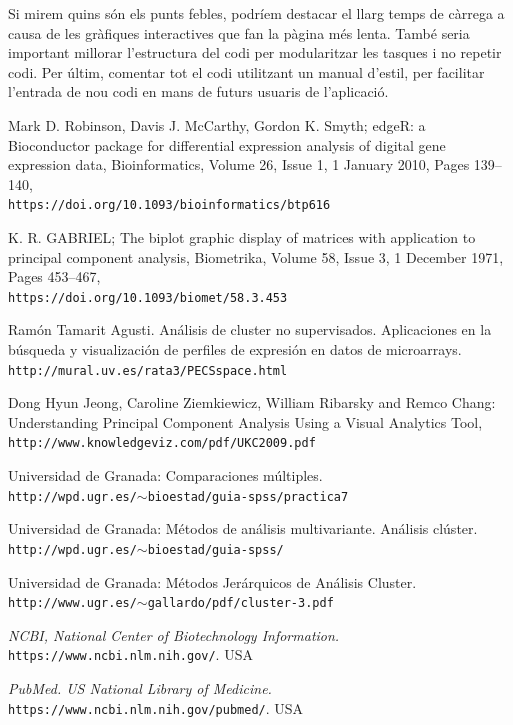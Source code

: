 \documentclass[english]{article}
\begin{document}
Si mirem quins són els punts febles, podríem destacar el llarg temps de càrrega a causa de les gràfiques interactives que fan la pàgina més lenta. També seria important millorar l'estructura del codi per modularitzar les tasques i no repetir codi. Per últim, comentar tot el codi utilitzant un manual d'estil, per facilitar l'entrada de nou codi en mans de futurs usuaris de l'aplicació.
\clearpage
\begin{thebibliography}{9}
Mark D. Robinson, Davis J. McCarthy, Gordon K. Smyth; edgeR: a Bioconductor package for differential expression analysis of digital gene expression data, Bioinformatics, Volume 26, Issue 1, 1 January 2010, Pages 139–140,
\\\texttt{https://doi.org/10.1093/bioinformatics/btp616}

K. R. GABRIEL; The biplot graphic display of matrices with application to principal component analysis, Biometrika, Volume 58, Issue 3, 1 December 1971, Pages 453–467, \\\texttt{https://doi.org/10.1093/biomet/58.3.453}

Ramón Tamarit Agusti. Análisis de cluster no supervisados. Aplicaciones en
la búsqueda y visualización de perfiles de expresión
en datos de microarrays.
\\\texttt{http://mural.uv.es/rata3/PECSspace.html}

Dong Hyun Jeong, Caroline Ziemkiewicz, William Ribarsky and Remco Chang: Understanding Principal Component Analysis Using a Visual Analytics Tool,
\\\texttt{http://www.knowledgeviz.com/pdf/UKC2009.pdf}

Universidad de Granada: Comparaciones múltiples.
\\\texttt{http://wpd.ugr.es/$\sim$bioestad/guia-spss/practica7}

Universidad de Granada: Métodos de análisis multivariante. Análisis clúster.
\\\texttt{http://wpd.ugr.es/$\sim$bioestad/guia-spss/}

Universidad de Granada: Métodos Jerárquicos de Análisis Cluster.
\\\texttt{http://www.ugr.es/$\sim$gallardo/pdf/cluster-3.pdf}

\textit{NCBI, National Center of Biotechnology Information.}
\\\texttt{https://www.ncbi.nlm.nih.gov/}. USA

\textit{PubMed. US National Library of Medicine.}
\\\texttt{https://www.ncbi.nlm.nih.gov/pubmed/}. USA

\end{thebibliography}
\clearpage
\appendix
\onecolumn
\end{document}
